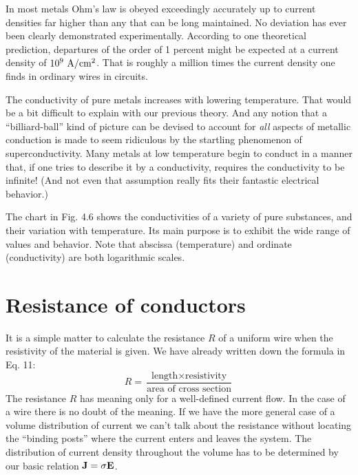 In most metals Ohm's law is obeyed exceedingly accurately up to
current densities far higher than any that can be long maintained.
No deviation has ever been clearly demonstrated experimentally.
According to one theoretical prediction, departures of the order of
1 percent might be expected at a current density of $10^9\ \textup{A}/\textup{cm}^2$.
That is roughly a million times the current density one finds in
ordinary wires in circuits.

The conductivity of pure metals increases with lowering temperature.
That would be a bit difficult to explain with our previous
theory. And any notion that a ``billiard-ball'' kind of picture can be
devised to account for \emph{all} aspects of metallic conduction is made to
seem ridiculous by the startling phenomenon of superconductivity.
Many metals at low temperature begin to conduct in a manner that,
if one tries to describe it by a conductivity, requires the conductivity
to be infinite! (And not even that assumption really fits their fantastic
electrical behavior.)

The chart in Fig. 4.6 shows the conductivities of a variety of pure
substances, and their variation with temperature. Its main purpose
is to exhibit the wide range of values and behavior. Note that
abscissa (temperature) and ordinate (conductivity) are both logarithmic
scales.

\section{Resistance of conductors}

It is a simple matter to calculate the resistance $R$ of a uniform wire
when the resistivity of the material is given. We have already written
down the formula in Eq. 11:
\begin{equation}
  R = \frac{\text{length}\times\text{resistivity}}{\text{area of cross section}}
\end{equation}
The resistance $R$ has meaning only for a well-defined current flow.
In the case of a wire there is no doubt of the meaning. If we have the
more general case of a volume distribution of current we can't talk
about the resistance without locating the ``binding posts'' where the
current enters and leaves the system. The distribution of current
density throughout the volume has to be determined by our basic
relation $\mathbf{J} = \sigma\mathbf{E}$.

